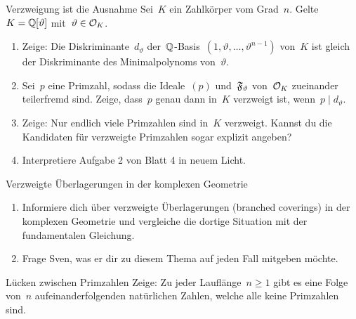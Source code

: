 \documentclass[entwurf]{uebblatt}
\begin{document}

\begin{aufgabe}{Verzweigung ist die Ausnahme}
Sei~$K$ ein Zahlkörper vom Grad~$n$. Gelte~$K = \mathbb{Q}[\vartheta]$ mit~$\vartheta
\in \mathcal{O}_K$.
\begin{enumerate}
\item Zeige: Die Diskriminante~$d_\vartheta$
der~$\mathbb{Q}$-Basis~$(1,\vartheta,\ldots,\vartheta^{n-1})$ von~$K$ ist gleich der
Diskriminante des Minimalpolynoms von~$\vartheta$.
\item Sei~$p$ eine Primzahl, sodass die Ideale~$(p)$ und~$\mathfrak{F}_\vartheta$
von~$\mathcal{O}_K$ zueinander teilerfremd sind. Zeige, dass~$p$ genau dann in~$K$
verzweigt ist, wenn~$p \mid d_\vartheta$.
\item Zeige: Nur endlich viele Primzahlen sind in~$K$ verzweigt. Kannst du die
Kandidaten für verzweigte Primzahlen sogar explizit angeben?
\item Interpretiere Aufgabe 2 von Blatt 4 in neuem Licht.
\end{enumerate}
\end{aufgabe}

\begin{aufgabe*}{Verzweigte Überlagerungen in der komplexen Geometrie}
\begin{enumerate}
\item Informiere dich über verzweigte Überlagerungen (branched coverings) in der
komplexen Geometrie und vergleiche die dortige Situation mit der fundamentalen
Gleichung.
\item Frage Sven, was er dir zu diesem Thema auf jeden Fall mitgeben möchte.
\end{enumerate}
\end{aufgabe*}

\begin{aufgabe*}{Lücken zwischen Primzahlen}
Zeige: Zu jeder Lauflänge~$n \geq 1$ gibt es eine Folge von~$n$
aufeinanderfolgenden natürlichen Zahlen, welche alle keine Primzahlen sind.
\end{aufgabe*}
\end{document}
